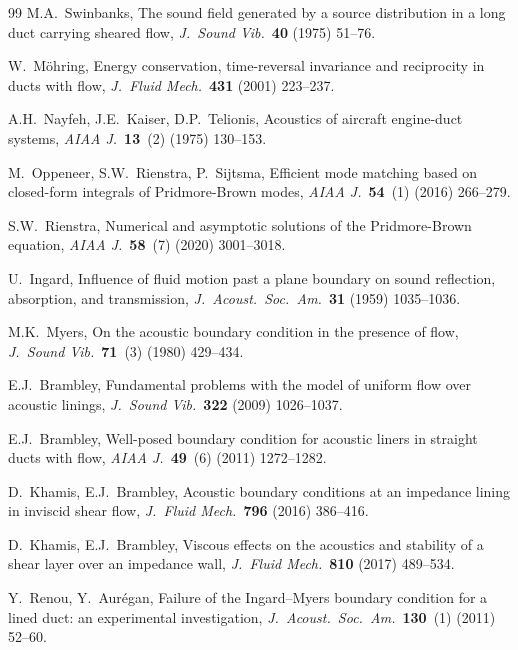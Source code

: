 \documentclass[11pt,a4paper]{article}
\theoremstyle{plain}
\theoremstyle{remark}
\begin{document}
\begin{thebibliography}{99}
 M.A.\ Swinbanks, The sound field generated by a source distribution in a long duct
carrying sheared flow, \emph{J.\ Sound Vib.}\ \textbf{40} (1975) 51--76.

 W.\ M\"ohring, Energy conservation, time-reversal invariance and reciprocity in ducts
with flow, \emph{J.\ Fluid Mech.}\ \textbf{431} (2001) 223--237.

 A.H.\ Nayfeh, J.E.\ Kaiser, D.P.\ Telionis, Acoustics of aircraft engine-duct systems,
\emph{AIAA J.}\ \textbf{13}~(2) (1975) 130--153.

 M.\ Oppeneer, S.W.\ Rienstra, P.\ Sijtsma, Efficient mode matching based on
closed-form integrals of Pridmore-Brown modes, \emph{AIAA J.}\ \textbf{54}~(1) (2016) 266--279.

 S.W.\ Rienstra, Numerical and asymptotic solutions of the Pridmore-Brown
equation, \emph{AIAA J.}\ \textbf{58}~(7) (2020) 3001--3018.

 U.\ Ingard, Influence of fluid motion past a plane boundary on sound reflection,
absorption, and transmission, \emph{J.\ Acoust.\ Soc.\ Am.}\ \textbf{31} (1959) 1035--1036.

 M.K.\ Myers, On the acoustic boundary condition in the presence of flow, \emph{J.\
Sound Vib.}\ \textbf{71}~(3) (1980) 429--434.

 E.J.\ Brambley, Fundamental problems with the model of uniform flow over
acoustic linings, \emph{J.\ Sound Vib.}\ \textbf{322} (2009) 1026--1037.

 E.J.\ Brambley, Well-posed boundary condition for acoustic liners in straight ducts
with flow, \emph{AIAA J.}\ \textbf{49}~(6) (2011) 1272--1282.

 D.\ Khamis, E.J.\ Brambley, Acoustic boundary conditions at an impedance
lining in inviscid shear flow, \emph{J.\ Fluid Mech.}\ \textbf{796} (2016) 386--416.

 D.\ Khamis, E.J.\ Brambley, Viscous effects on the acoustics and stability
of a shear layer over an impedance wall, \emph{J.\ Fluid Mech.}\ \textbf{810} (2017) 489--534.

 Y.\ Renou, Y.\ Aur\'egan, Failure of the Ingard--Myers boundary condition for a
lined duct: an experimental investigation, \emph{J.\ Acoust.\ Soc.\ Am.}\ \textbf{130}~(1) (2011)
52--60.


\end{thebibliography}
\end{document}
